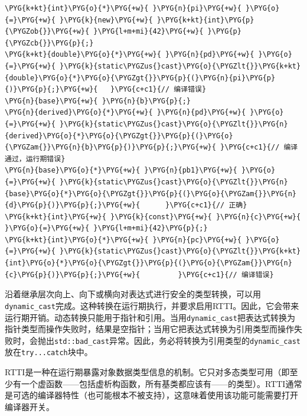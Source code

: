 
\begin{codeblockbg}
\begin{Verbatim}[commandchars=\\\{\},breaklines=true,breakanywhere=true,fontsize=\codefont,xleftmargin=17bp]
\PYG{k+kt}{int}\PYG{o}{*}\PYG{+w}{ }\PYG{n}{pi}\PYG{+w}{ }\PYG{o}{=}\PYG{+w}{ }\PYG{k}{new}\PYG{+w}{ }\PYG{k+kt}{int}\PYG{p}{\PYGZob{}}\PYG{+w}{ }\PYG{l+m+mi}{42}\PYG{+w}{ }\PYG{p}{\PYGZcb{}}\PYG{p}{;}
\PYG{k+kt}{double}\PYG{o}{*}\PYG{+w}{ }\PYG{n}{pd}\PYG{+w}{ }\PYG{o}{=}\PYG{+w}{ }\PYG{k}{static\PYGZus{}cast}\PYG{o}{\PYGZlt{}}\PYG{k+kt}{double}\PYG{o}{*}\PYG{o}{\PYGZgt{}}\PYG{p}{(}\PYG{n}{pi}\PYG{p}{)}\PYG{p}{;}\PYG{+w}{   }\PYG{c+c1}{// 编译错误}
\PYG{n}{base}\PYG{+w}{ }\PYG{n}{b}\PYG{p}{;}
\PYG{n}{derived}\PYG{o}{*}\PYG{+w}{ }\PYG{n}{pd}\PYG{+w}{ }\PYG{o}{=}\PYG{+w}{ }\PYG{k}{static\PYGZus{}cast}\PYG{o}{\PYGZlt{}}\PYG{n}{derived}\PYG{o}{*}\PYG{o}{\PYGZgt{}}\PYG{p}{(}\PYG{o}{\PYGZam{}}\PYG{n}{b}\PYG{p}{)}\PYG{p}{;}\PYG{+w}{ }\PYG{c+c1}{// 编译通过，运行期错误}
\PYG{n}{base}\PYG{o}{*}\PYG{+w}{ }\PYG{n}{pb1}\PYG{+w}{ }\PYG{o}{=}\PYG{+w}{ }\PYG{k}{static\PYGZus{}cast}\PYG{o}{\PYGZlt{}}\PYG{n}{base}\PYG{o}{*}\PYG{o}{\PYGZgt{}}\PYG{p}{(}\PYG{o}{\PYGZam{}}\PYG{n}{d}\PYG{p}{)}\PYG{p}{;}\PYG{+w}{      }\PYG{c+c1}{// 正确}
\PYG{k+kt}{int}\PYG{+w}{ }\PYG{k}{const}\PYG{+w}{ }\PYG{n}{c}\PYG{+w}{ }\PYG{o}{=}\PYG{+w}{ }\PYG{l+m+mi}{42}\PYG{p}{;}
\PYG{k+kt}{int}\PYG{o}{*}\PYG{+w}{ }\PYG{n}{pc}\PYG{+w}{ }\PYG{o}{=}\PYG{+w}{ }\PYG{k}{static\PYGZus{}cast}\PYG{o}{\PYGZlt{}}\PYG{k+kt}{int}\PYG{o}{*}\PYG{o}{\PYGZgt{}}\PYG{p}{(}\PYG{o}{\PYGZam{}}\PYG{n}{c}\PYG{p}{)}\PYG{p}{;}\PYG{+w}{         }\PYG{c+c1}{// 编译错误}
\end{Verbatim}
\end{codeblockbg}



沿着继承层次向上、向下或横向对表达式进行安全的类型转换，可以用\texttt{dynamic\_\allowbreak{}cast}完成。这种转换在运行期执行，并要求启用RTTI。因此，它会带来运行期开销。动态转换只能用于指针和引用。当用\texttt{dynamic\_\allowbreak{}cast}把表达式转换为指针类型而操作失败时，结果是空指针；当用它把表达式转换为引用类型而操作失败时，会抛出\texttt{std::\allowbreak{}bad\_\allowbreak{}cast}异常。因此，务必将转换为引用类型的\texttt{dynamic\_\allowbreak{}cast}放在\texttt{try...\allowbreak{}catch}块中。



\begin{myNote}
RTTI是一种在运行期暴露对象数据类型信息的机制。它只对多态类型可用（即至少有一个虚函数——包括虚析构函数，所有基类都应该有——的类型）。RTTI通常是可选的编译器特性（也可能根本不被支持），这意味着使用该功能可能需要打开编译器开关。
\end{myNote}


